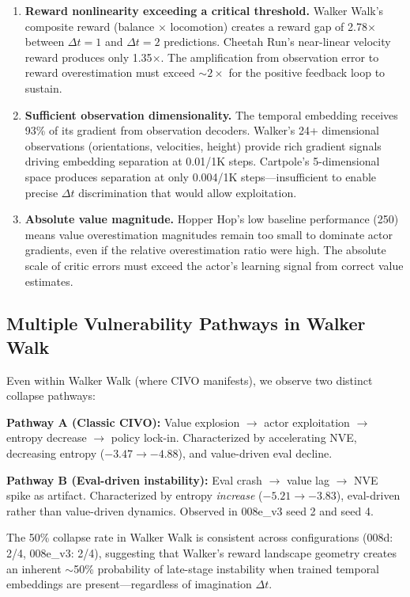 \documentclass[letterpaper]{article}
\begin{document}
\begin{enumerate}
    \item \textbf{Reward nonlinearity exceeding a critical threshold.} Walker Walk's composite reward (balance $\times$ locomotion) creates a reward gap of 2.78$\times$ between $\Delta t=1$ and $\Delta t=2$ predictions. Cheetah Run's near-linear velocity reward produces only 1.35$\times$. The amplification from observation error to reward overestimation must exceed $\sim 2\times$ for the positive feedback loop to sustain.

    \item \textbf{Sufficient observation dimensionality.} The temporal embedding receives 93\% of its gradient from observation decoders. Walker's 24+ dimensional observations (orientations, velocities, height) provide rich gradient signals driving embedding separation at 0.01/1K steps. Cartpole's 5-dimensional space produces separation at only 0.004/1K steps---insufficient to enable precise $\Delta t$ discrimination that would allow exploitation.

    \item \textbf{Absolute value magnitude.} Hopper Hop's low baseline performance (250) means value overestimation magnitudes remain too small to dominate actor gradients, even if the relative overestimation ratio were high. The absolute scale of critic errors must exceed the actor's learning signal from correct value estimates.
\end{enumerate}

\subsection{Multiple Vulnerability Pathways in Walker Walk}

Even within Walker Walk (where CIVO manifests), we observe two distinct collapse pathways:

\textbf{Pathway A (Classic CIVO):} Value explosion $\to$ actor exploitation $\to$ entropy decrease $\to$ policy lock-in. Characterized by accelerating NVE, decreasing entropy ($-3.47 \to -4.88$), and value-driven eval decline.

\textbf{Pathway B (Eval-driven instability):} Eval crash $\to$ value lag $\to$ NVE spike as artifact. Characterized by entropy \emph{increase} ($-5.21 \to -3.83$), eval-driven rather than value-driven dynamics. Observed in 008e\_v3 seed 2 and seed 4.

The 50\% collapse rate in Walker Walk is consistent across configurations (008d: 2/4, 008e\_v3: 2/4), suggesting that Walker's reward landscape geometry creates an inherent $\sim$50\% probability of late-stage instability when trained temporal embeddings are present---regardless of imagination $\Delta t$.
\end{document}
